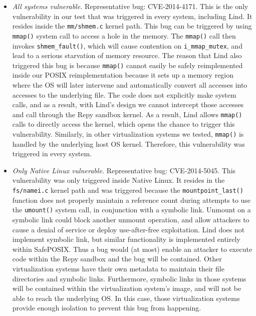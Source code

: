 {{\begin{itemize}
\item \emph{All systems vulnerable.}  Representative bug: CVE-2014-4171.
This is the only vulnerability in our test that was triggered in every
system, including Lind. It resides inside the \texttt{mm/shmem.c} kernel path. This bug can
be triggered by using \texttt{mmap()} system call to access a hole in the memory.
The \texttt{mmap()} call then invokes \texttt{shmem\_fault()}, which will cause contention
on \texttt{i\_mmap\_mutex}, and lead to a serious starvation of memory resource. 
The reason that Lind also triggered this bug is because \texttt{mmap()} cannot easily
be safely reimplemented inside our POSIX reimplementation because it sets up a
memory region where the OS will later
intervene and automatically convert all accesses into accesses to the
underlying file.  The code does not explicitly make system calls, and as
a result, with Lind's design we cannot intercept those accesses and call through
the Repy sandbox kernel. As a result,
Lind allows \texttt{mmap()} calls to directly access the kernel, which
opens the chance to trigger this vulnerability. Similarly, in other
virtualization systems we tested, \texttt{mmap()} is handled by the underlying
host OS kernel.  
Therefore, this vulnerability was triggered in every system.

\item \emph{Only Native Linux vulnerable.}  Representative bug: CVE-2014-5045.
This vulnerability was only triggered inside Native Linux. It resides in the
\texttt{fs/namei.c} kernel path and was triggered because
the \texttt{mountpoint\_last()}
function does not properly
maintain a reference count during attempts to use the \texttt{umount()} system call,
in conjunction with a symbolic link. Unmount 
on a symbolic link could block another unmount operation,
and allow attackers to cause a denial of service or deploy use-after-free exploitation.
Lind does not implement symbolic link, but similar functionality is implemented entirely
within SafePOSIX.  Thus a bug would (at most) enable an attacker to execute
code within the Repy sandbox and the bug will be contained.
Other virtualization systems have their own metadata to maintain their file directories and symbolic links. 
Furthermore, symbolic links in those systems will be contained within the virtualization system's image,
and will not be able to reach the underlying OS. In this case, those virtualization systems provide enough
isolation to prevent this bug from happening.


\end{itemize}}}
